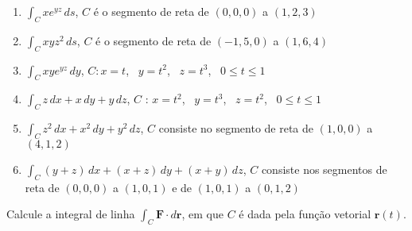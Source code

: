 \documentclass[a4paper, 12pt]{article}
\begin{document}
\begin{enumerate}
		\item $\displaystyle \int_C xe^{yz} \, ds$, \quad $C$ é o segmento de reta de $(0,0,0)$ a $(1,2,3)$

		\item $\displaystyle \int_C xyz^2 \, ds$, \quad $C$ é o segmento de reta de $(-1,5,0)$ a $(1,6,4)$
		\resposta{\fazer}

		\item $\displaystyle \int_C xye^{yz} \, dy$, \quad $C: x = t$, \, $y = t^2$, \, $z = t^3$, \, $0 \leq t \leq 1$

		\item $\displaystyle \int_C z \, dx + x \, dy + y \, dz$, \quad $C$ : $x = t^2$, \, $y = t^3$, \, $z = t^2$, \, $0 \leq t \leq 1$
		\resposta{\fazer}

		\item $\displaystyle \int_C z^2 \, dx + x^2 \, dy + y^2 \, dz$, \quad $C$ consiste no segmento de reta de $(1,0,0)$ a $(4,1,2)$

		\item $\displaystyle \int_C (y + z) \, dx + (x + z) \, dy + (x + y) \, dz$, \quad $C$ consiste nos segmentos de reta de $(0,0,0)$ a $(1,0,1)$ e de $(1,0,1)$ a $(0,1,2)$
	
	\end{enumerate}
	
	\vspace{5mm}
	
	Calcule a integral de linha $\displaystyle \int_C \textbf{F} \cdot d\textbf{r}$, em que $C$ é dada pela função vetorial $\textbf{r}(t)$.
	
\end{document}
